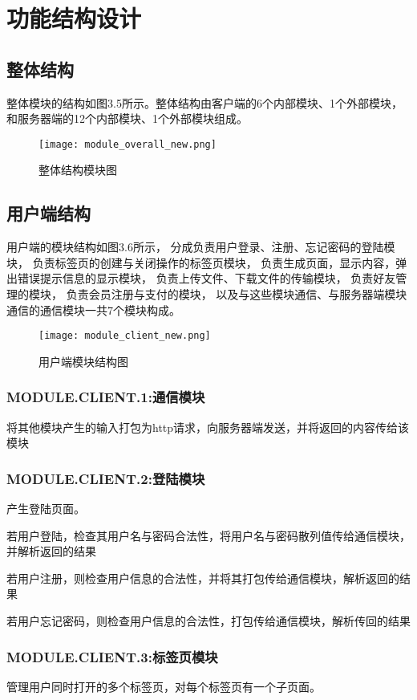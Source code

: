 \section{功能结构设计}
\subsection{整体结构} 
整体模块的结构如图3.5所示。整体结构由客户端的6个内部模块、1个外部模块，和服务器端的12个内部模块、1个外部模块组成。

\begin{figure}[htbp] 
\centering 
\texttt{[image: module\_overall\_new.png]} 
\caption{整体结构模块图}\label{fig:noted-figure}
\end{figure}

\subsection{用户端结构}
用户端的模块结构如图3.6所示，
分成负责用户登录、注册、忘记密码的登陆模块，
负责标签页的创建与关闭操作的标签页模块，
负责生成页面，显示内容，弹出错误提示信息的显示模块，
负责上传文件、下载文件的传输模块，
{
\color{red}
负责好友管理的模块，
负责会员注册与支付的模块，
}
以及与这些模块通信、与服务器端模块通信的通信模块一共7个模块构成。
\begin{figure}[!h]  
\centering 
\texttt{[image: module\_client\_new.png]} 
\caption{用户端模块结构图}\label{fig:noted-figure}
\end{figure}   

\subsubsection{MODULE.CLIENT.1:通信模块}
将其他模块产生的输入打包为http请求，向服务器端发送，并将返回的内容传给该模块

\subsubsection{MODULE.CLIENT.2:登陆模块}
产生登陆页面。

若用户登陆，检查其用户名与密码合法性，将用户名与密码散列值传给通信模块，并解析返回的结果

若用户注册，则检查用户信息的合法性，并将其打包传给通信模块，解析返回的结果

若用户忘记密码，则检查用户信息的合法性，打包传给通信模块，解析传回的结果

\subsubsection{MODULE.CLIENT.3:标签页模块}
管理用户同时打开的多个标签页，对每个标签页有一个子页面。

